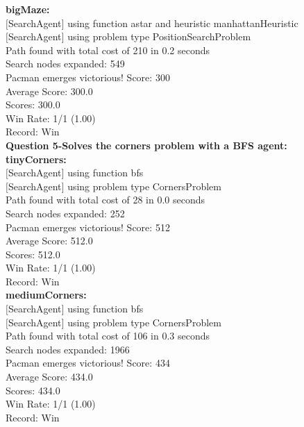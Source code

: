 \documentclass[11pt]{article}
\begin{document}
\noindent
\textbf{bigMaze:}\\
$[$SearchAgent$]$ using function astar and heuristic manhattanHeuristic\\
$[$SearchAgent$]$ using problem type PositionSearchProblem\\
Path found with total cost of 210 in 0.2 seconds\\
Search nodes expanded: 549\\
Pacman emerges victorious! Score: 300\\
Average Score: 300.0\\
Scores:        300.0\\
Win Rate:      1/1 (1.00)\\
Record:        Win\\

\newpage
\noindent
\textbf{Question 5-Solves the corners problem with a BFS agent:}\\
\textbf{tinyCorners:}\\
$[$SearchAgent$]$ using function bfs\\
$[$SearchAgent$]$ using problem type CornersProblem\\
Path found with total cost of 28 in 0.0 seconds\\
Search nodes expanded: 252\\
Pacman emerges victorious! Score: 512\\
Average Score: 512.0\\
Scores:        512.0\\
Win Rate:      1/1 (1.00)\\
Record:        Win\\

\noindent
\textbf{mediumCorners:}\\
$[$SearchAgent$]$ using function bfs\\
$[$SearchAgent$]$ using problem type CornersProblem\\
Path found with total cost of 106 in 0.3 seconds\\
Search nodes expanded: 1966\\
Pacman emerges victorious! Score: 434\\
Average Score: 434.0\\
Scores:        434.0\\
Win Rate:      1/1 (1.00)\\
Record:        Win\\
\end{document}
